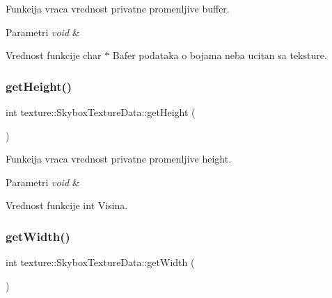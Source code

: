 Funkcija vraca vrednost privatne promenljive buffer. 


\begin{DoxyParams}{Parametri}
{\em void} & \\
\hline
\end{DoxyParams}
\begin{DoxyReturn}{Vrednost funkcije}
char $\ast$ Bafer podataka o bojama neba ucitan sa teksture. 
\end{DoxyReturn}
\mbox{\label{classtexture_1_1SkyboxTextureData_acc1182e6b2f28ef7a138b6a87bec0c22}} 
\subsubsection{\texorpdfstring{get\+Height()}{getHeight()}}
{\footnotesize\ttfamily int texture\+::\+Skybox\+Texture\+Data\+::get\+Height (\begin{DoxyParamCaption}{ }\end{DoxyParamCaption})}



Funkcija vraca vrednost privatne promenljive height. 


\begin{DoxyParams}{Parametri}
{\em void} & \\
\hline
\end{DoxyParams}
\begin{DoxyReturn}{Vrednost funkcije}
int Visina. 
\end{DoxyReturn}
\mbox{\label{classtexture_1_1SkyboxTextureData_a216985ffe51ed362c3e29c167767496e}} 
\subsubsection{\texorpdfstring{get\+Width()}{getWidth()}}
{\footnotesize\ttfamily int texture\+::\+Skybox\+Texture\+Data\+::get\+Width (\begin{DoxyParamCaption}{ }\end{DoxyParamCaption})}



